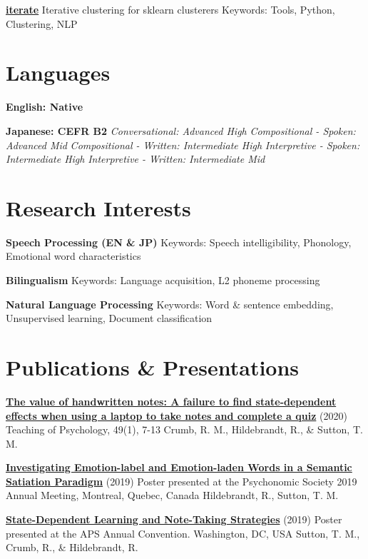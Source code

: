 \documentclass[a4paper,9pt]{extarticle}
\begin{document}
\noindent
\textbf{\href{https://github.com/ryancahildebrandt/iterate}{iterate}}
Iterative clustering for sklearn clusterers
Keywords: Tools, Python, Clustering, NLP

\section*{Languages}

\noindent
\textbf{English: Native}

\noindent
\textbf{Japanese: CEFR B2}
\textit{Conversational: Advanced High}
\textit{Compositional - Spoken: Advanced Mid}
\textit{Compositional - Written: Intermediate High}
\textit{Interpretive - Spoken: Intermediate High}
\textit{Interpretive - Written: Intermediate Mid}

\section*{Research Interests}

\noindent
\textbf{Speech Processing (EN \& JP)}
Keywords: Speech intelligibility, Phonology, Emotional word characteristics

\noindent
\textbf{Bilingualism}
Keywords: Language acquisition, L2 phoneme processing

\noindent
\textbf{Natural Language Processing}
Keywords: Word \& sentence embedding, Unsupervised learning, Document classification

\section*{Publications \& Presentations}

\noindent
\textbf{\href{http://dx.doi.org/10.1177/0098628320979895}{The value of handwritten notes: A failure to find state-dependent effects when using a laptop to take notes and complete a quiz}} (2020)
Teaching of Psychology, 49(1), 7-13
Crumb, R. M., Hildebrandt, R., \& Sutton, T. M.

\noindent
\textbf{\href{}{Investigating Emotion-label and Emotion-laden Words in a Semantic Satiation Paradigm}} (2019)
Poster presented at the Psychonomic Society 2019 Annual Meeting, Montreal, Quebec, Canada
Hildebrandt, R., Sutton, T. M.

\noindent
\textbf{\href{}{State-Dependent Learning and Note-Taking Strategies}} (2019)
Poster presented at the APS Annual Convention. Washington, DC, USA
Sutton, T. M., Crumb, R., \& Hildebrandt, R.
\end{document}
